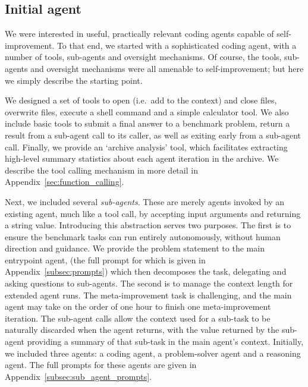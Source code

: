 \subsection{Initial agent}%
\label{subsec:tools}

We were interested in useful, practically relevant coding agents capable of self-improvement.
To that end, we started with a sophisticated coding agent, with a number of tools, sub-agents and oversight mechanisms.
Of course, the tools, sub-agents and oversight mechanisms were all amenable to self-improvement; but here we simply describe the starting point.

We designed a set of tools to open (i.e.~add to the context) and close files, overwrite files, execute a shell command and a simple calculator tool. We also include basic tools to submit a final answer to a benchmark problem, return a result from a sub-agent call to its caller, as well as exiting early from a sub-agent call. Finally, we provide an `archive analysis' tool, which facilitates extracting high-level summary statistics about each agent iteration in the archive.
We describe the tool calling mechanism in more detail in Appendix~\ref{sec:function_calling}.

Next, we included several \emph{sub-agents}. These are merely agents invoked by
an existing agent, much like a tool call, by accepting input arguments and
returning a string value.
Introducing this abstraction serves two purposes.
The first is to ensure the benchmark tasks can run entirely autonomously, without human direction and guidance.
We provide the problem statement to the main entrypoint agent, (the full prompt for which is given in Appendix~\ref{subsec:prompts})
which then decomposes the task, delegating and asking questions to sub-agents.
The second is to manage the context length for extended agent runs. The meta-improvement task is challenging, and the main agent may take on the order of one hour to finish one meta-improvement iteration. The sub-agent calls allow the context used for a sub-task to be naturally discarded when the agent returns, with the value returned by the sub-agent providing a summary of that sub-task in the main agent's context.
Initially, we included three agents: a coding agent, a problem-solver agent and a reasoning agent.
The full prompts for these agents are given in Appendix~\ref{subsec:sub_agent_prompts}.

